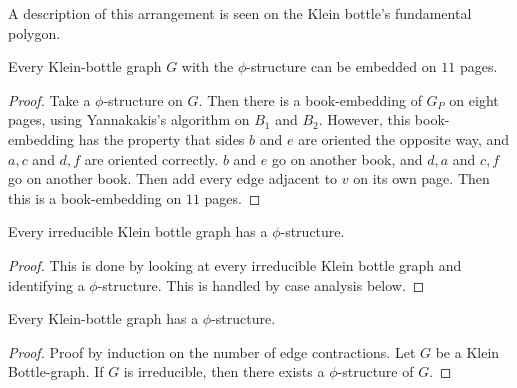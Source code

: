 A description of this arrangement is seen on the Klein bottle's fundamental polygon. 
\begin{claim}
    Every Klein-bottle graph $G$ with the $\phi$-structure can be embedded on $11$ pages. 
\end{claim}
\begin{proof}
    Take a $\phi$-structure on $G$. Then there is a book-embedding of $G_P$ on eight pages, using Yannakakis's algorithm on $B_1$ and $B_2$. However, this book-embedding has the property that sides $b$ and $e$ are oriented the opposite way, and $a, c$ and $d, f$ are oriented correctly. $b$ and $e$ go on another book, and $d, a$ and $c, f$ go on another book. Then add every edge adjacent to $v$ on its own page. Then this is a book-embedding on $11$ pages. 
\end{proof}

\begin{lemma}
    Every irreducible Klein bottle graph has a $\phi$-structure. 
\end{lemma}

\begin{proof}
    This is done by looking at every irreducible Klein bottle graph and identifying a $\phi$-structure. This is handled by case analysis below.
\end{proof}

\begin{lemma}
    Every Klein-bottle graph has a $\phi$-structure. 
\end{lemma}

\begin{proof}
    Proof by induction on the number of edge contractions. Let $G$ be a Klein Bottle-graph. If $G$ is irreducible, then there exists a $\phi$-structure of $G$. 
\end{proof}